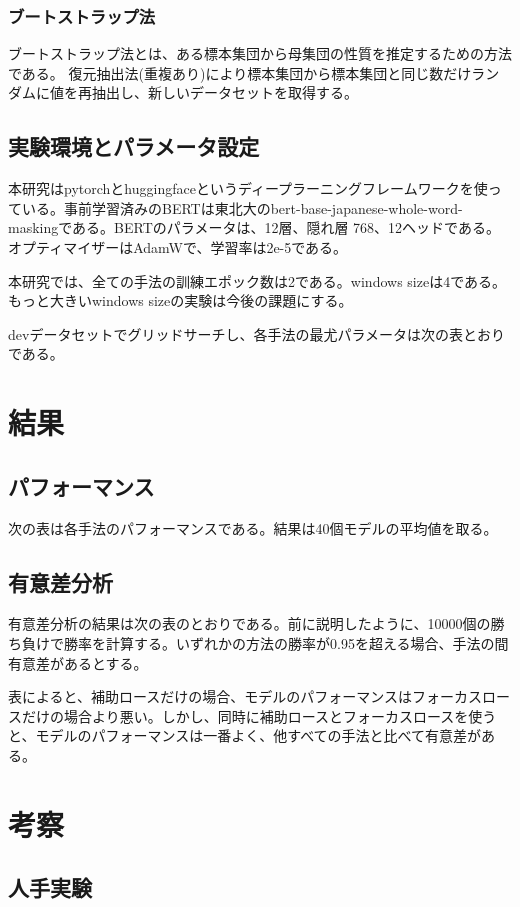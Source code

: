 \documentclass[
  platex, dvipdfmx,  %
]{nlp2021}
\begin{document}
\subsubsection{ブートストラップ法}

ブートストラップ法とは、ある標本集団から母集団の性質を推定するための方法である。 復元抽出法(重複あり)により標本集団から標本集団と同じ数だけランダムに値を再抽出し、新しいデータセットを取得する。

\subsection{実験環境とパラメータ設定}

本研究はpytorchとhuggingfaceというディープラーニングフレームワークを使っている。事前学習済みのBERTは東北大のbert-base-japanese-whole-word-maskingである。BERTのパラメータは、12層、隠れ層 768、12ヘッドである。オプティマイザーはAdamWで、学習率は2e-5である。

本研究では、全ての手法の訓練エポック数は2である。windows sizeは4である。もっと大きいwindows sizeの実験は今後の課題にする。

devデータセットでグリッドサーチし、各手法の最尤パラメータは次の表とおりである。

\section{結果}

\subsection{パフォーマンス}

次の表は各手法のパフォーマンスである。結果は40個モデルの平均値を取る。

\subsection{有意差分析}

有意差分析の結果は次の表のとおりである。前に説明したように、10000個の勝ち負けで勝率を計算する。いずれかの方法の勝率が0.95を超える場合、手法の間有意差があるとする。

表によると、補助ロースだけの場合、モデルのパフォーマンスはフォーカスロースだけの場合より悪い。しかし、同時に補助ロースとフォーカスロースを使うと、モデルのパフォーマンスは一番よく、他すべての手法と比べて有意差がある。

\section{考察}

\subsection{人手実験}
\end{document}
